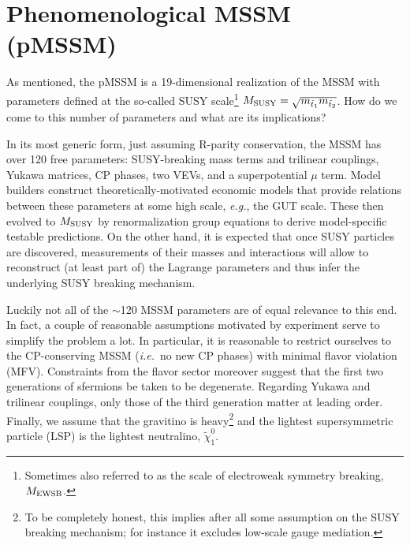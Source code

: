 \section{Phenomenological MSSM (pMSSM)}
\label{sec:model}

As mentioned, the pMSSM is a 19-dimensional realization of the MSSM 
with parameters defined at the so-called SUSY scale\footnote{Sometimes 
also referred to as the scale of electroweak symmetry breaking, $M_{\rm EWSB}$.} 
$M_{\rm SUSY}=\sqrt{m_{\tilde t_1}m_{\tilde t_2}}$. How do we come to 
this number of parameters and what are its implications?

In its most generic form, just assuming R-parity conservation, 
the MSSM has over 120 free parameters: 
SUSY-breaking mass terms and trilinear couplings, Yukawa matrices, 
CP phases, two VEVs, and a superpotential $\mu$ term. 
Model builders construct theoretically-motivated economic models 
that provide relations between these parameters at some high scale, 
{\it e.g.}, the GUT scale. 
These then evolved to $M_{\rm SUSY}$ by renormalization group equations 
to derive model-specific testable predictions. On the other 
hand, it is expected that once SUSY particles are discovered, measurements 
of their masses and interactions will allow to reconstruct (at least 
part of) the Lagrange parameters and thus infer the underlying SUSY 
breaking mechanism.
 
Luckily not all of the $\sim$120 MSSM parameters are of equal relevance to this end.
In fact, a couple of reasonable assumptions motivated by experiment serve to 
simplify the problem a lot. In particular, it is reasonable to restrict ourselves 
to the CP-conserving MSSM ({\it i.e.}\ no new CP phases) with minimal flavor violation (MFV).  
Constraints from the flavor sector moreover suggest that the first two generations 
of sfermions be taken to be degenerate. Regarding Yukawa and trilinear couplings, 
only those of the third generation matter at leading order. 
Finally, we assume that the gravitino is heavy\footnote{To be completely honest, 
this implies after all some assumption on the SUSY breaking mechanism; for instance it 
excludes low-scale gauge mediation.} and the lightest supersymmetric 
particle (LSP) is the lightest neutralino, $\tilde\chi^0_1$.
 
